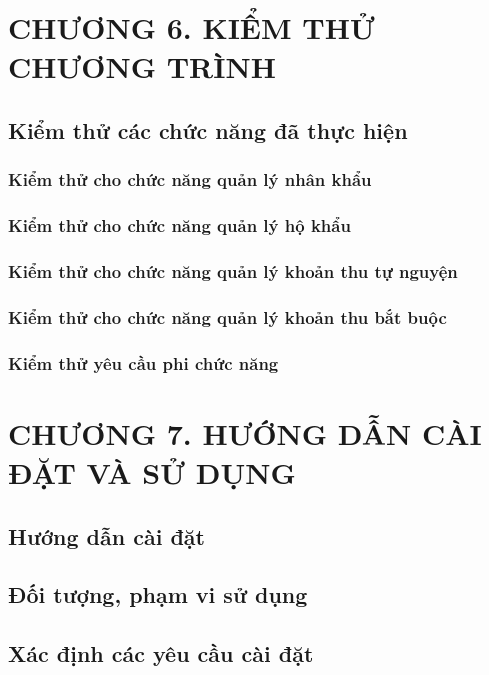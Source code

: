 \documentclass{article}
\begin{document}
\section*{CHƯƠNG 6. KIỂM THỬ CHƯƠNG TRÌNH}
\setcounter{section}{6}
\setcounter{subsection}{0}
\subsection{Kiểm thử các chức năng đã thực hiện}
\subsubsection{Kiểm thử cho chức năng quản lý nhân khẩu}
\subsubsection{Kiểm thử cho chức năng quản lý hộ khẩu}
\subsubsection{Kiểm thử cho chức năng quản lý khoản thu tự nguyện}
\subsubsection{Kiểm thử cho chức năng quản lý khoản thu bắt buộc}
\subsubsection{Kiểm thử yêu cầu phi chức năng}
\newpage

\section*{CHƯƠNG 7. HƯỚNG DẪN CÀI ĐẶT VÀ SỬ DỤNG}
\setcounter{section}{7}
\setcounter{subsection}{0}
\subsection{Hướng dẫn cài đặt}
\subsection{Đối tượng, phạm vi sử dụng}
\subsection{Xác định các yêu cầu cài đặt}
\end{document}
